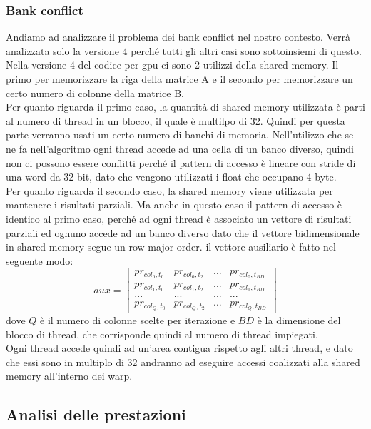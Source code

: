 \documentclass[conference]{IEEEtran}
\begin{document}
\subsubsection{Bank conflict}
Andiamo ad analizzare il problema dei bank conflict nel nostro contesto. Verrà analizzata solo la versione 4 perché tutti gli altri casi sono sottoinsiemi di questo.\\
Nella versione 4 del codice per gpu ci sono 2 utilizzi della shared memory. Il primo per memorizzare la riga della matrice A e il secondo per memorizzare un certo numero di colonne della matrice B.\\
Per quanto riguarda il primo caso, la quantità di shared memory utilizzata è parti al numero di thread in un blocco, il quale è multilpo di 32. Quindi per questa parte verranno usati un certo numero di banchi di memoria. Nell'utilizzo che se ne fa nell'algoritmo ogni thread accede ad una cella di un banco diverso, quindi non ci possono essere conflitti perché il pattern di accesso è lineare con stride di una word da 32 bit, dato che vengono utilizzati i float che occupano 4 byte.\\
Per quanto riguarda il secondo caso, la shared memory viene utilizzata per mantenere i risultati parziali. Ma anche in questo caso il pattern di accesso è identico al primo caso, perché ad ogni thread è associato un vettore di risultati parziali ed ognuno accede ad un banco diverso dato che il vettore bidimensionale in shared memory segue un row-major order. il vettore ausiliario è fatto nel seguente modo:
\[
aux = \left[
\begin{matrix}
pr_{col_0, t_0} & pr_{col_0, t_2} & ... & pr_{col_0, t_{BD}} \\
pr_{col_1, t_0} & pr_{col_1, t_2} & ... & pr_{col_1, t_{BD}} \\
... & ... & ... & ... \\
pr_{col_{Q}, t_0} & pr_{col_{Q}, t_2} & ... & pr_{col_{Q}, t_{BD}}
\end{matrix}\right]
\]
dove $Q$ è il numero di colonne scelte per iterazione e $BD$ è la dimensione del blocco di thread, che corrisponde quindi al numero di thread impiegati.\\
Ogni thread accede quindi ad un'area contigua rispetto agli altri thread, e dato che essi sono in multiplo di 32 andranno ad eseguire accessi coalizzati alla shared memory all'interno dei warp.

\subsection{Analisi delle prestazioni}
\end{document}
